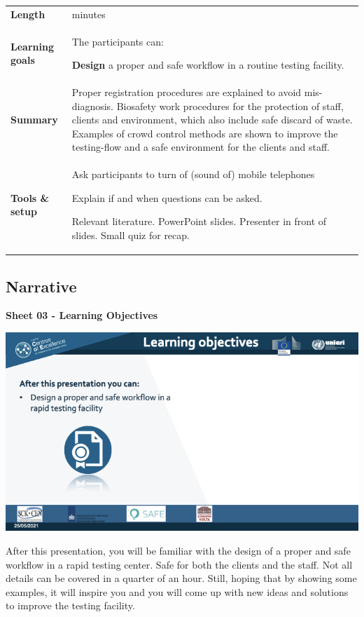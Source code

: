 \documentclass[
]{book}
\begin{document}
\begin{longtable}[]{@{}
  >{\raggedright\arraybackslash}p{}
  >{\raggedright\arraybackslash}p{}@{}}
\toprule
\endhead
\textbf{Length} & 15 minutes \\
\textbf{Learning
goals} & The participants can:

\textbf{Design} a proper and safe workflow in a routine
testing facility. \\
\textbf{Summary} & Proper registration procedures are explained to
avoid mis-diagnosis. Biosafety work procedures for
the protection of staff, clients and environment,
which also include safe discard of waste. Examples
of crowd control methods are shown to improve the
testing-flow and a safe environment for the
clients and staff. \\
\textbf{Tools \&
setup} & Ask participants to turn of (sound of) mobile
telephones

Explain if and when questions can be asked.

Relevant literature. PowerPoint slides. Presenter
in front of slides. Small quiz for recap. \\
\bottomrule
\end{longtable}

\hypertarget{narrative-3}{%
\subsection{Narrative}\label{narrative-3}}

\textbf{Sheet 03 - Learning Objectives}

\includegraphics{images/m05/m05_Workflow_final.003.jpeg}

After this presentation, you will be familiar with the design of a
proper and safe workflow in a rapid testing center. Safe for both the
clients and the staff. Not all details can be covered in a quarter of an
hour. Still, hoping that by showing some examples, it will inspire you
and you will come up with new ideas and solutions to improve the testing
facility.
\end{document}
